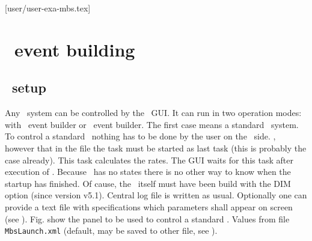 [user/user-exa-mbs.tex]
\section[MBS event building]{\mbs\ event building}
\subsection[MBS setup]{\mbs\ setup}
Any \mbs\ system can be controlled by the \dabc\ GUI.
It can run in two operation modes: with \mbs\ event builder or \dabc\ event builder.
The first case means a standard \mbs\ system.
To control a standard \mbs\ nothing has to be done by the user on the \mbs\ side.
, however that in the  file the  task must be
started as last task (this is probably the case already).
This task calculates the rates. The GUI waits for this task after execution of
. Because \mbs\ has no states there is no other way to
know when the startup has finished.
Of cause, the \mbs\ itself must have been build with the DIM option (since version v5.1).
Central log file is written as usual.
Optionally one can provide a text file with specifications which parameters
shall appear on screen (see ).
Fig.  show the panel to be used to control
a standard \mbs.
Values from file {\tt MbsLaunch.xml} (default, may be saved to other file,
see ).
